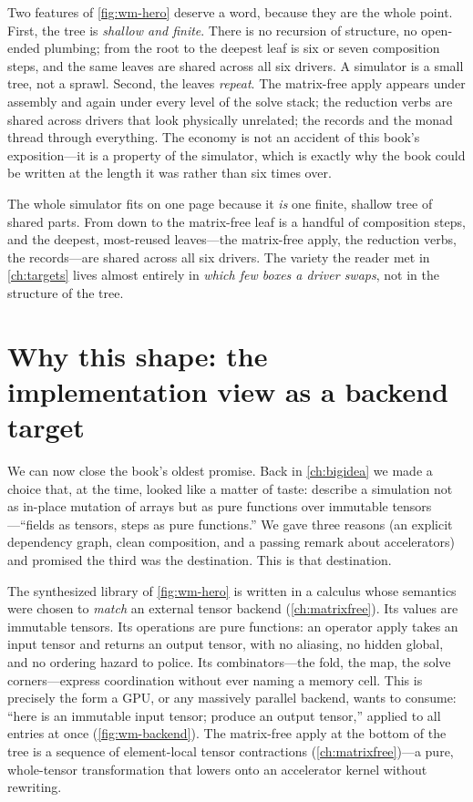 Two features of \cref{fig:wm-hero} deserve a word, because they are the whole point.
First, the tree is \emph{shallow and finite}. There is no recursion of structure, no
open-ended plumbing; from the root to the deepest leaf is six or seven composition
steps, and the same leaves are shared across all six drivers. A simulator is a small
tree, not a sprawl. Second, the leaves \emph{repeat}. The matrix-free apply appears
under assembly and again under every level of the solve stack; the reduction verbs are
shared across drivers that look physically unrelated; the records and the monad thread
through everything. The economy is not an accident of this book's exposition---it is a
property of the simulator, which is exactly why the book could be written at the length
it was rather than six times over.

\begin{keyidea}
The whole simulator fits on one page because it \emph{is} one finite, shallow tree of
shared parts. From  down to the matrix-free leaf is a handful of
composition steps, and the deepest, most-reused leaves---the matrix-free apply, the
reduction verbs, the records---are shared across all six drivers. The variety the
reader met in \cref{ch:targets} lives almost entirely in \emph{which few boxes a
driver swaps}, not in the structure of the tree.
\end{keyidea}

\section{Why this shape: the implementation view as a backend target}
\label{sec:wm-backend}

We can now close the book's oldest promise. Back in \cref{ch:bigidea} we made a
choice that, at the time, looked like a matter of taste: describe a simulation not as
in-place mutation of arrays but as pure functions over immutable tensors---``fields as
tensors, steps as pure functions.'' We gave three reasons (an explicit dependency
graph, clean composition, and a passing remark about accelerators) and promised the
third was the destination. This is that destination.

The synthesized library of \cref{fig:wm-hero} is written in a calculus whose semantics
were chosen to \emph{match} an external tensor backend
(\cref{ch:matrixfree}). Its values are immutable tensors. Its operations are pure
functions: an operator apply takes an input tensor and returns an output tensor, with
no aliasing, no hidden global, and no ordering hazard to police. Its combinators---the
fold, the map, the solve corners---express coordination without ever naming a memory
cell. This is precisely the form a GPU, or any massively parallel backend, wants to
consume: ``here is an immutable input tensor; produce an output tensor,'' applied to
all entries at once (\cref{fig:wm-backend}). The matrix-free apply at the bottom of
the tree is a sequence of element-local tensor contractions
(\cref{ch:matrixfree})---a pure, whole-tensor transformation that lowers onto an
accelerator kernel without rewriting.

